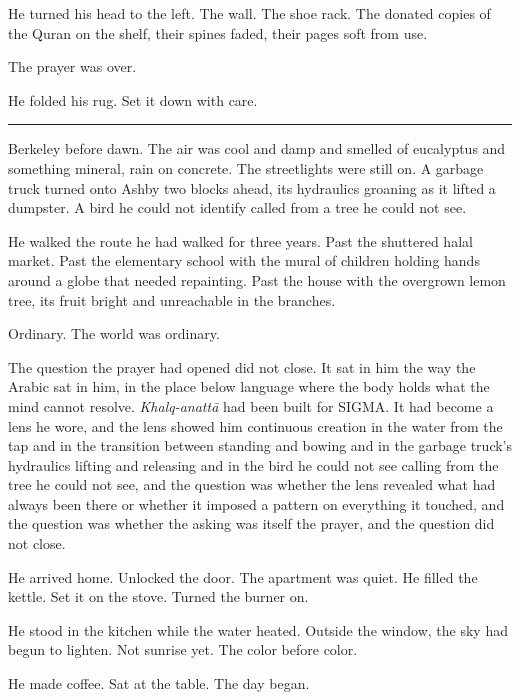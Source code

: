 He turned his head to the left. The wall. The shoe rack. The donated copies of the Quran on the shelf, their spines faded, their pages soft from use.

The prayer was over.

He folded his rug. Set it down with care.

\begin{center}\rule{0.3\linewidth}{0.4pt}\end{center}

Berkeley before dawn. The air was cool and damp and smelled of eucalyptus and something mineral, rain on concrete. The streetlights were still on. A garbage truck turned onto Ashby two blocks ahead, its hydraulics groaning as it lifted a dumpster. A bird he could not identify called from a tree he could not see.

He walked the route he had walked for three years. Past the shuttered halal market. Past the elementary school with the mural of children holding hands around a globe that needed repainting. Past the house with the overgrown lemon tree, its fruit bright and unreachable in the branches.

Ordinary. The world was ordinary.

The question the prayer had opened did not close. It sat in him the way the Arabic sat in him, in the place below language where the body holds what the mind cannot resolve. \emph{Khalq-anatt\=a} had been built for SIGMA. It had become a lens he wore, and the lens showed him continuous creation in the water from the tap and in the transition between standing and bowing and in the garbage truck's hydraulics lifting and releasing and in the bird he could not see calling from the tree he could not see, and the question was whether the lens revealed what had always been there or whether it imposed a pattern on everything it touched, and the question was whether the asking was itself the prayer, and the question did not close.

He arrived home. Unlocked the door. The apartment was quiet. He filled the kettle. Set it on the stove. Turned the burner on.

He stood in the kitchen while the water heated. Outside the window, the sky had begun to lighten. Not sunrise yet. The color before color.

He made coffee. Sat at the table. The day began.

